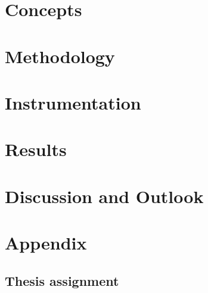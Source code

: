 \documentclass[11pt,a4paper]{article}
\begin{document}
    

    \clearpage
    \section{Concepts}
    \label{sec:concepts}

    

    \clearpage
    \section{Methodology}
    \label{sec:methodology}

    

    \clearpage
    \section{Instrumentation}
    \label{sec:implementation}

    

    \clearpage
    \section{Results}
    \label{sec:results}

    

    \clearpage
    \section{Discussion and Outlook}
    \label{sec:outlook}

    

    \clearpage
    \listoffigures

    \listoftables

    \listofalgorithms

    \printglossary[type=\acronymtype]

    \printglossary

    \clearpage
    \printbibliography

    \clearpage
    \section*{Appendix}

    \clearpage
    \subsection*{Thesis assignment}
    
\end{document}

